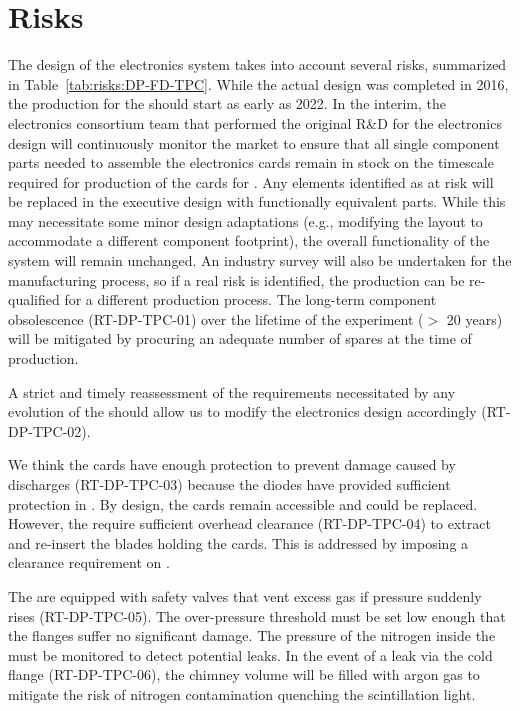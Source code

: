 \section{Risks}
\label{sec:dp-tpcelec-risks}





The design of the  electronics system takes into account several risks, summarized in Table~\ref{tab:risks:DP-FD-TPC}. While the actual design was completed in 2016, the production for the  should start as early as 2022. In the interim, the   electronics consortium team that performed the original R\&D for the electronics design will continuously monitor the market to ensure that all single component parts needed to assemble the electronics cards remain in stock on the timescale required for production of the cards for . Any elements identified as at risk will be replaced in the executive design with functionally equivalent parts. While this may necessitate some minor design adaptations (e.g., modifying the  layout to accommodate a different component footprint), the overall functionality of the system will remain unchanged. An industry survey will also be undertaken for the   manufacturing process, so if a real risk is identified, the  production can be re-qualified for a different production process. The long-term component obsolescence (RT-DP-TPC-01) over the lifetime of the experiment ($>$ \num{20} years) will be mitigated by procuring an adequate number of spares at the time of production.

A strict and timely reassessment of the  requirements necessitated by any evolution of the   should allow us to modify the   electronics design accordingly (RT-DP-TPC-02).

We think the  cards have enough protection to prevent damage caused by  discharges (RT-DP-TPC-03) because the   diodes have provided sufficient protection in . By design, the  cards remain accessible and could be replaced. However, the  require sufficient overhead clearance (RT-DP-TPC-04) to extract and re-insert the blades holding the  cards. This is addressed by imposing a clearance requirement on .

The  are equipped with safety valves that vent excess gas if pressure suddenly rises (RT-DP-TPC-05). The over-pressure threshold must be set low enough that the flanges suffer no significant damage. The pressure of the nitrogen inside the  must be monitored to detect potential leaks. In the event of a leak via the cold flange (RT-DP-TPC-06), the chimney volume will be filled with argon gas to mitigate the risk of nitrogen contamination quenching the scintillation light.  

